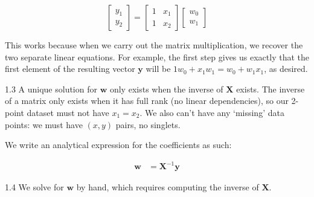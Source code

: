 \documentclass{harvardml}
\theoremstyle{definition}
\theoremstyle{plain}
\begin{document}


$$\begin{bmatrix}  y_1 \\ y_2 \end{bmatrix} =
\begin{bmatrix} 1 & x_1\\ 1 & x_2 \end{bmatrix} \begin{bmatrix} w_0 \\ w_1 \end{bmatrix}$$

This works because when we carry out the matrix multiplication, we recover the two separate linear equations. For example, the first step gives us exactly that the first element of the resulting vector $\mathbf{y}$ will be $1w_0+x_1w_1 = w_0 + w_1x_1$, as desired.

\medskip

1.3 A unique solution for $\mathbf{w}$ only exists when the inverse of $\mathbf{X}$ exists. The inverse of a matrix only exists when it has full rank (no linear dependencies), so our 2-point dataset must not have $x_1=x_2$. We also can't have any `missing' data points: we must have $(x,y)$ pairs, no singlets.

We write an analytical expression for the coefficients as such:

\begin{align*}
    \mathbf{w} &= \mathbf{X}^{-1} \mathbf{y}
\end{align*}

\medskip

1.4 We solve for $\mathbf{w}$ by hand, which requires computing the inverse of $\mathbf{X}$.
\end{document}
